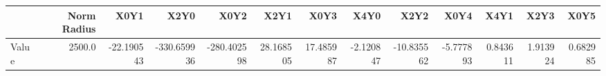 \documentclass[convert={convertexe={magick.exe}}]{standalone}
\begin{document}
\begin{tabular}{lrrrrrrrrrrrr}
\toprule
{} &  Norm Radius &       X0Y1 &        X2Y0 &        X0Y2 &       X2Y1 &       X0Y3 &      X4Y0 &       X2Y2 &      X0Y4 &      X4Y1 &      X2Y3 &      X0Y5 \\
\midrule
Value &       2500.0 & -22.190543 & -330.659936 & -280.402598 &  28.168505 &  17.485987 & -2.120847 & -10.835562 & -5.777893 &  0.843611 &  1.913924 &  0.682985 \\
\bottomrule
\end{tabular}
\end{document}
